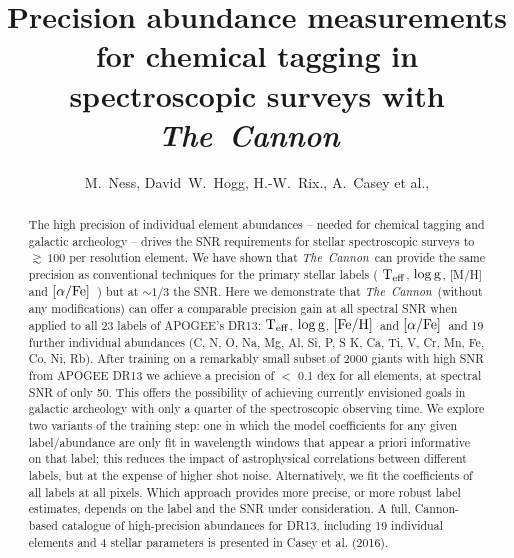 \documentclass[12pt, preprint]{aastex}
\newcommand{\project}[1]{\textsl{#1}}
\newcommand{\tc}{\project{The~Cannon}}
\newcommand{\teff}{\mbox{$\rm T_{eff}$}}
\newcommand{\feh}{\mbox{$\rm [Fe/H]$}}
\newcommand{\alphafe}{\mbox{$\rm [\alpha/Fe]$}}
\newcommand{\logg}{\mbox{$\rm \log g$}}
\begin{document}
\title{Precision abundance measurements for chemical tagging in spectroscopic surveys with \tc\  }
\author{M.~Ness,
        David~W.~Hogg,
        H.-W.~Rix.,
         A.~Casey et al.,}


\begin{abstract}%

The high precision of individual element abundances -- needed for chemical tagging and galactic archeology -- drives the SNR requirements for stellar 
spectroscopic surveys to $\gtrsim~100$ per resolution element. We have shown that \tc\   can provide the same precision as conventional techniques
for the primary stellar labels ( \teff, \logg, [M/H] and \alphafe\ ) 
 but at $\sim 1/3$ the SNR. Here we demonstrate that \tc\ (without any modifications) can offer a comparable precision gain at all spectral SNR when 
applied to all 23 labels of APOGEE's DR13: \teff, \logg, \feh\ and \alphafe\ and 19 further individual abundances (C, N, O, Na, Mg, Al, Si, P, S K, Ca, Ti, V, Cr, Mn, Fe, Co, Ni, Rb). 
After training on a remarkably small subset of 2000 giants with high SNR from APOGEE DR13 we achieve a precision of $<$ 0.1 dex for all elements, at spectral SNR of only 50.
This offers the possibility of achieving currently envisioned goals in galactic archeology with only a quarter of the spectroscopic observing time.
We explore two variants of the training step: one in which the model coefficients for any given label/abundance are only fit in 
wavelength windows that appear a priori informative on that label; this reduces the impact of astrophysical correlations between different labels, but at the expense 
of higher shot noise. Alternatively, we fit the coefficients of all labels at all pixels.
Which approach provides more precise, or more robust label estimates, depends on the label and the SNR under consideration.
A full, Cannon-based catalogue of high-precision abundances for DR13, including 19 individual elements and 4 stellar parameters is presented in Casey et al. (2016). 

\end{abstract}
\end{document}
